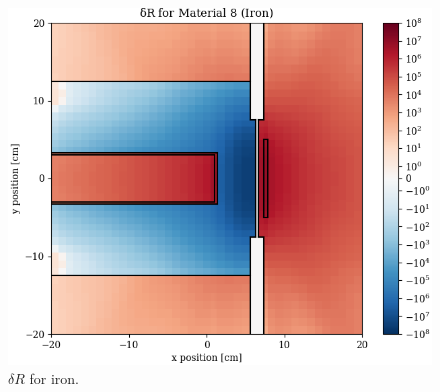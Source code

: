 \begin{figure}
\begin{minipage}{0.49\linewidth}
    \includegraphics[width=\linewidth]{content/testprob/dR_08.png}
    \caption{$\delta R$ for iron.}
    \label{fig:testprob:dR_08}
  \end{minipage}
\end{figure}
